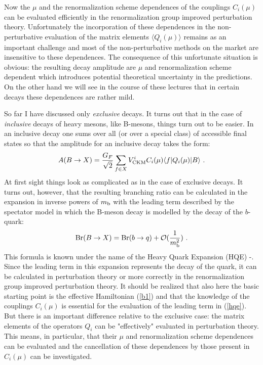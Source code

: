 \documentclass[12pt,rotate]{article}
\newcommand{\mb}{m_{\rm b}}
\newcommand{\be}{\begin{equation}}
\newcommand{\ee}{\end{equation}}
\newcommand{\ord}{{\cal O}}
\begin{document}
Now the $\mu$ and the renormalization scheme dependences of the couplings 
$C_i(\mu)$ can
be evaluated efficiently in the renormalization group improved perturbation
theory. Unfortunately the incorporation of these dependences in the
non-perturbative evaluation of the matrix elements  
$\langle Q_i(\mu)\rangle$
remains as an important
challenge and most of the non-perturbative methods on the market are
insensitive to these dependences. The consequence of this unfortunate
situation is obvious: the resulting decay amplitude are $\mu$ and 
renormalization
scheme dependent which introduces potential theoretical uncertainty in the
predictions. On the other hand we will see in the course of these lectures
that in certain decays these dependences are rather mild.

So far I have discussed only  {\it exclusive} decays. It turns out that
in the case of {\it inclusive} decays of heavy mesons, like B-mesons,
things turn out to be easier. In an inclusive decay one sums over all 
(or over
a special class) of accessible final states so that the amplitude for an
inclusive decay takes the form:
\be\label{ampi}
A(B\to X)
=\frac{G_F}{\sqrt{2}}\sum_{f\in X} 
V^i_{\rm CKM}C_i(\mu)\langle f|Q_i(\mu)|B\rangle~.
\ee
At first sight things look as complicated as in the case of exclusive decays.
It turns out, however, that the resulting branching ratio can be calculated
in the expansion in inverse powers of $\mb$ with the leading term 
described by the spectator model
in which the B-meson decay is modelled by the decay of the $b$-quark:
\be\label{hqe}
{\rm Br}(B\to X)={\rm Br}(b\to q) +\ord(\frac{1}{\mb^2})~. 
\ee
This formula is known under the name of the Heavy Quark Expansion (HQE)
\cite{HQE1}-\cite{HQE3}.
Since the leading term in this expansion represents the decay of the quark,
it can be calculated in perturbation theory or more correctly in the
renormalization group improved perturbation theory. It should be realized
that also here the basic starting point is the effective Hamiltonian 
 (\ref{b1})
and that the knowledge of the couplings $C_i(\mu)$ is essential for 
the evaluation of
the leading term in (\ref{hqe}). But there is an important difference 
relative to the
exclusive case: the matrix elements of the operators $Q_i$ can be 
"effectively"
evaluated in perturbation theory. 
This means, in particular, that their $\mu$ and renormalization scheme
dependences can be evaluated and the cancellation of these dependences by
those present in $C_i(\mu)$ can be investigated.
\end{document}
